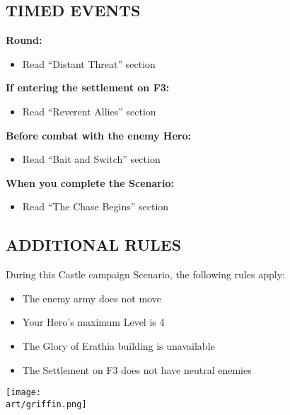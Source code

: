 \newpage

\begin{multicols}{2}

\subsection*{\MakeUppercase{Timed Events}}

\textbf{ Round:}
\begin{itemize}
  \item Read ``Distant Threat'' section
\end{itemize}

\textbf{If entering the settlement on F3:}
\begin{itemize}
  \item Read ``Reverent Allies'' section
\end{itemize}

\textbf{Before combat with the enemy Hero:}
\begin{itemize}
  \item Read ``Bait and Switch'' section
\end{itemize}

\textbf{When you complete the Scenario:}
\begin{itemize}
  \item Read ``The Chase Begins'' section
\end{itemize}

\subsection*{\MakeUppercase{Additional rules}}

During this Castle campaign Scenario, the following rules apply:

\begin{itemize}
  \item The enemy army does not move
  \item Your Hero's maximum Level is 4
  \item The Glory of Erathia building is unavailable
  \item The Settlement on F3 does not have neutral enemies
\end{itemize}

\columnbreak

{
  \texttt{[image: \\art/griffin.png]}
}

\end{multicols}

